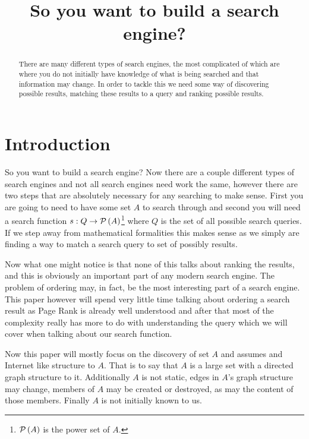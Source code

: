 \documentclass{article}
\title{So you want to build a search engine?}
\begin{document}
	\maketitle
	
	\tableofcontents
	
	\begin{abstract}
		There are many different types of search engines, the most complicated of which are where you do not initially have knowledge of what is being searched and that information may change. In order to tackle this we need some way of discovering possible results, matching these results to a query and ranking possible results. %
	\end{abstract}
	
	\section{Introduction}
	So you want to build a search engine? Now there are a couple different types of search engines and not all search engines need work the same, however there are two steps that are absolutely necessary for any searching to make sense. First you are going to need to have some set $A$ to search through and second you will need a search function $s:Q\to\mathcal P\left( {A} \right)$\footnote{$\mathcal P\left( {A} \right)$ is the power set of $A$.} where $Q$ is the set of all possible search queries. If we step away from mathematical formalities this makes sense as we simply are finding a way to match a search query to set of possibly results.
	
	Now what one might notice is that none of this talks about ranking the results, and this is obviously an important part of any modern search engine. The problem of ordering may, in fact, be the most interesting part of a search engine. This paper however will spend very little time talking about ordering a search result as Page Rank is already well understood and after that most of the complexity really has more to do with understanding the query which we will cover when talking about our search function.
	
	Now this paper will mostly focus on the discovery of set $A$ and assumes and Internet like structure to $A$. That is to say that $A$ is a large set with a directed graph structure to it. Additionally $A$ is not static, edges in $A$'s graph structure may change, members of $A$ may be created or destroyed, as may the content of those members. Finally $A$ is not initially known to us.
	
\end{document}
